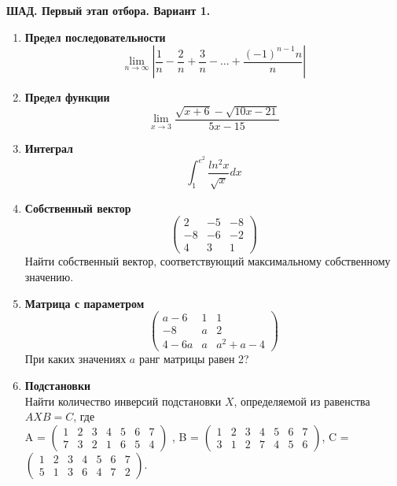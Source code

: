 \documentclass{report}
\begin{document}
\thispagestyle{empty}
\begin{center}
\Large
\textbf{ШАД. Первый этап отбора. Вариант 1.}
\end{center}
	
\vspace{1 cm}
\Large			
						
\begin{enumerate}
\item \textbf{Предел последовательности}\\
 $$\lim_{n\to\infty} \left|\frac{1}{n} -  \frac{2}{n} + \frac{3}{n} - \ldots + \frac{(-1)^{n-1}n}{n} \right|$$

\item \textbf{Предел функции} \\
$$\lim_{x\to 3} \frac{\sqrt{x+6} - \sqrt{10x-21}}{5x-15}$$

\item \textbf{Интеграл} \\
$$\int_{1}^{e^2} \frac{ln^2x}{\sqrt{x}} dx$$

\item \textbf{Собственный вектор} \\
\[ \left( \begin{matrix}
2 & -5 & -8 \\
-8 & -6 & -2 \\
4 & 3 & 1 \end{matrix} \right)\] Найти собственный вектор, соответствующий максимальному собственному значению. 

\item \textbf{Матрица с параметром} \\
\[ \left( \begin{matrix}
a-6 & 1 & 1 \\
-8 & a & 2 \\
4-6a & a & a^2+a-4 \end{matrix} \right)\] При каких значениях $a$ ранг матрицы равен 2?

\item \textbf{Подстановки} \\
 Найти количество инверсий подстановки $X$, определяемой из равенства $AXB = C$, где \\
A =  $\left( \begin{matrix} 1 & 2 & 3 & 4 & 5 & 6 & 7 \\ 7 & 3 & 2 & 1 & 6 & 5 & 4 \end{matrix} \right)$ , 
B =   $\left( \begin{matrix} 1 & 2 & 3 & 4 & 5 & 6 & 7 \\ 3 & 1 & 2 & 7 & 4 & 5 & 6 \end{matrix} \right)$,
C =   $\left( \begin{matrix}1 & 2 & 3 & 4 & 5 & 6 & 7 \\ 5 & 1 & 3 & 6 & 4 & 7 & 2 \end{matrix} \right)$.


\end{enumerate}
\end{document}
